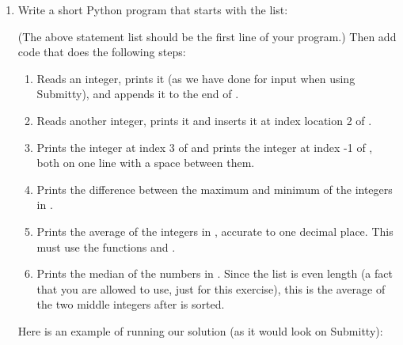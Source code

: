 \documentclass[letterpaper,10pt,english]{sphinxmanual}
\begin{document}
\begin{enumerate}
\item {} 
Write a short Python program that starts with the list:

\begin{sphinxVerbatim}[commandchars=\\\{\}]
  \PYG{p}{[}     \PYG{p}{]}
\end{sphinxVerbatim}

(The above statement list should be the first line of your
program.)  Then add code that does the following steps:
\begin{enumerate}
\def\theenumii{\arabic{enumii}}
\def\labelenumii{\theenumii .}
\makeatletter\def\p@enumiii{\p@enumii \theenumii .}\makeatother
\item {} 
Reads an integer, prints it (as we have done for input when using
Submitty), and appends it to the end of .

\item {} 
Reads another integer, prints it and inserts it at index
location 2 of .

\item {} 
Prints the integer at index 3 of  and prints the
integer at index -1 of , both on one line with a space between them.

\item {} 
Prints the difference between the maximum and minimum of the
integers in .

\item {} 
Prints the average of the integers in , accurate to
one decimal place. This must use the functions  and
.

\item {} 
Prints the median of the numbers in .  Since the list
is even length (a fact that you are allowed to use, just for this
exercise), this is the average of the two middle integers after
 is sorted.

\end{enumerate}

Here is an example of running our solution (as it would look on Submitty):

\begin{sphinxVerbatim}[commandchars=\\\{\}]
   
   
 
 
 
 
\end{sphinxVerbatim}

\end{enumerate}
\end{document}
